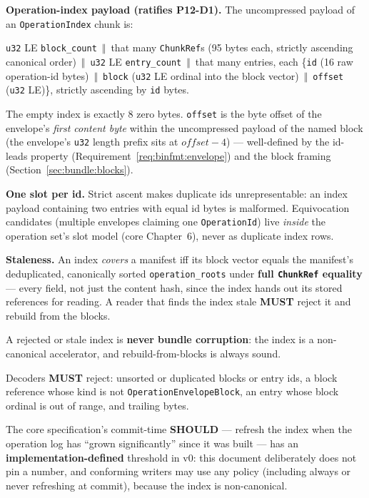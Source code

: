 \documentclass[11pt,letterpaper]{report}
\newcounter{requirement}[chapter]
\newcommand{\MUST}{\textbf{MUST}}
\newcommand{\SHOULD}{\textbf{SHOULD}}
\newcommand{\cat}{\ensuremath{\,\Vert\,}}
\begin{document}
\begin{requirement}
\label{req:binfmt:opindex}
\textbf{Operation-index payload (ratifies P12-D1).} The uncompressed payload
of an \texttt{OperationIndex} chunk is:

\begin{center}
\texttt{u32} LE \texttt{block\_count} \cat{} that many \texttt{ChunkRef}s
(95 bytes each, strictly ascending canonical order) \cat{}
\texttt{u32} LE \texttt{entry\_count} \cat{} that many entries, each
\{\texttt{id} (16 raw operation-id bytes) \cat{} \texttt{block}
(\texttt{u32} LE ordinal into the block vector) \cat{} \texttt{offset}
(\texttt{u32} LE)\}, strictly ascending by \texttt{id} bytes.
\end{center}

The empty index is exactly 8 zero bytes. \texttt{offset} is the byte offset
of the envelope's \emph{first content byte} within the uncompressed payload
of the named block (the envelope's \texttt{u32} length prefix sits at
$\mathit{offset}-4$) --- well-defined by the id-leads property
(Requirement~\ref{req:binfmt:envelope}) and the block framing
(Section~\ref{sec:bundle:blocks}).

\textbf{One slot per id.} Strict ascent makes duplicate ids unrepresentable:
an index payload containing two entries with equal id bytes is malformed.
Equivocation candidates (multiple envelopes claiming one
\texttt{OperationId}) live \emph{inside} the operation set's slot model
(core Chapter~6), never as duplicate index rows.

\textbf{Staleness.} An index \emph{covers} a manifest iff its block vector
equals the manifest's deduplicated, canonically sorted
\texttt{operation\_roots} under \textbf{full \texttt{ChunkRef} equality} ---
every field, not just the content hash, since the index hands out its stored
references for reading. A reader that finds the index stale \MUST{} reject
it and rebuild from the blocks.

A rejected or stale index is \textbf{never bundle corruption}: the index is
a non-canonical accelerator, and rebuild-from-blocks is always sound.

Decoders \MUST{} reject: unsorted or duplicated blocks or entry ids, a block
reference whose kind is not \texttt{OperationEnvelopeBlock}, an entry whose
block ordinal is out of range, and trailing bytes.
\end{requirement}

The core specification's commit-time \SHOULD{} --- refresh the index when
the operation log has ``grown significantly'' since it was built --- has an
\textbf{implementation-defined} threshold in v0: this document deliberately
does not pin a number, and conforming writers may use any policy (including
always or never refreshing at commit), because the index is non-canonical.
\end{document}
